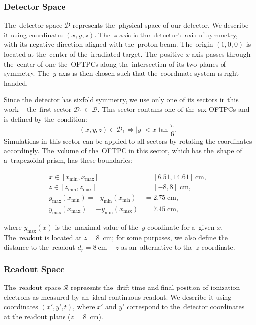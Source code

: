 			\subsubsection{Detector Space}
				The~detector space $\mathcal{D}$ represents the~physical space of our detector. We describe it using coordinates $(x,y,z)$. The~$z$-axis is the~detector's axis of symmetry, with its negative direction aligned with the~proton beam. The~origin $(0,0,0)$ is located at the~center of the~irradiated target. The~positive $x$-axis passes through the~center of one the~\ac{OFTPC}s along the~intersection of its two planes of symmetry. The~$y$-axis is then chosen such that the~coordinate system is right-handed.
				
				Since the~detector has sixfold symmetry, we use only one of its sectors in this work -- the~first sector $\mathcal{D}_1 \subset \mathcal{D}$. This sector contains one of the~six \ac{OFTPC}s and is defined by the~condition:
					\begin{equation}
						(x,y,z) \in \mathcal{D}_1 \Leftrightarrow |y| < x\tan \frac{\pi}{6}.
					\end{equation}
				Simulations in this sector can be applied to all sectors by rotating the coordinates accordingly. The~volume of the~\ac{OFTPC} in this sector, which has the~shape of a~trapezoidal prism, has these boundaries:
					\begin{linenomath}
					\begin{align}
						x \in [x_\text{min},x_\text{max}] &= [6.51, 14.61] \;\text{cm},\\
						z \in [z_\text{min},z_\text{max}] &= [-8,8] \;\text{cm},\\
						y_\text{max}(x_\text{min}) = -y_\text{min}(x_\text{min}) &=  2.75\;\text{cm},\\
						y_\text{max}(x_\text{max}) = -y_\text{min}(x_\text{max}) &=  7.45\;\text{cm},
					\end{align}
					\end{linenomath}
				where $y_\text{max}(x)$ is the~maximal value of the~$y$-coordinate for a~given $x$. The~readout is located at $z = 8$~cm; for some purposes, we also define the distance to the~readout $d_r = 8\;\text{cm}-z$ as an~alternative to the~$z$-coordinate.
			
			\subsubsection{Readout Space}
				The~readout space $\mathcal{R}$ represents the~drift time and final position of ionization electrons as measured by an~ideal continuous readout. We describe it using coordinates $(x',y',t)$, where $x'$ and $y'$ correspond to the~detector coordinates at the readout plane ($z = 8$~cm). 
			
